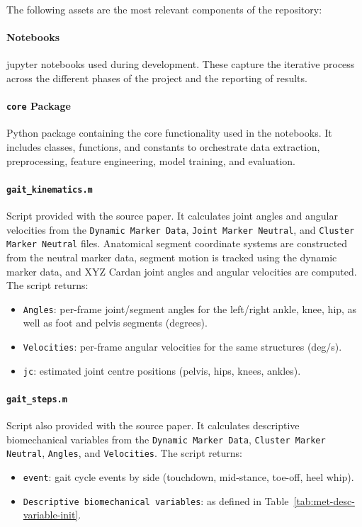 The following assets are the most relevant components of the repository:  

\paragraph{Notebooks}  
\Gls{jupyter} notebooks used during development. These capture the iterative process across the different phases of the project and the reporting of results.

\paragraph{\texttt{core} Package}  
Python package containing the core functionality used in the notebooks. It includes classes, functions, and constants to orchestrate data extraction, preprocessing, feature engineering, model training, and evaluation.  

\paragraph{\texttt{gait\_kinematics.m}}  
Script provided with the source paper. It calculates joint angles and angular velocities from the \texttt{Dynamic Marker Data}, \texttt{Joint Marker Neutral}, and \texttt{Cluster Marker Neutral} files. Anatomical segment coordinate systems are constructed from the neutral marker data, segment motion is tracked using the dynamic marker data, and XYZ Cardan joint angles and angular velocities are computed. The script returns:  
\begin{itemize}
    \item \texttt{Angles}: per-frame joint/segment angles for the left/right ankle, knee, hip, as well as foot and pelvis segments (degrees).
    \item \texttt{Velocities}: per-frame angular velocities for the same structures (deg/s).
    \item \texttt{jc}: estimated joint centre positions (pelvis, hips, knees, ankles).
\end{itemize}

\paragraph{\texttt{gait\_steps.m}}  
Script also provided with the source paper. It calculates descriptive biomechanical variables from the \texttt{Dynamic Marker Data}, \texttt{Cluster Marker Neutral}, \texttt{Angles}, and \texttt{Velocities}. The script returns:  
\begin{itemize}
    \item \texttt{event}: gait cycle events by side (touchdown, mid-stance, toe-off, heel whip).
    \item \texttt{Descriptive biomechanical variables}: as defined in Table~\ref{tab:met-desc-variable-init}.
\end{itemize}

